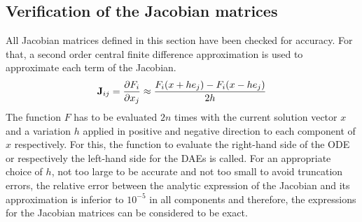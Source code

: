 \subsection{Verification of the Jacobian matrices}
All Jacobian matrices defined in this section have been checked for accuracy. For that, a second order central finite difference approximation \cite[p. 184]{introductionPartialDiffEquations} is used to approximate each term of the Jacobian. 
\begin{equation}
	\mathbf{J}_{ij} = \pdv{F_i}{x_j} \approx \frac{F_i(x + he_j) - F_i(x - he_j)}{2h}
\end{equation}
The function $F$ has to be evaluated $2n$ times with the current solution vector $x$ and a variation $h$ applied in positive and negative direction to each component of $x$ respectively. For this, the function to evaluate the right-hand side of the ODE or respectively the left-hand side for the DAEs is called. For an appropriate choice of $h$, not too large to be accurate and not too small to avoid truncation errors, the relative error between the analytic expression of the Jacobian and its approximation is inferior to $10^{-5}$ in all components and therefore, the expressions for the Jacobian matrices can be considered to be exact.

